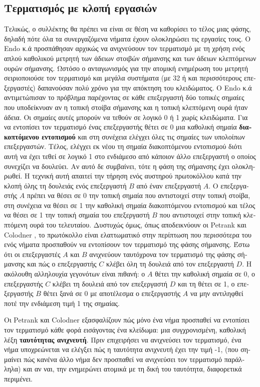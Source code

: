 \begin{greek}
\subsection{Τερματισμός με κλοπή εργασιών}
Τελικώς, ο συλλέκτης θα πρέπει να είναι σε θέση να καθορίσει
το τέλος μιας φάσης, δηλαδή πότε όλα τα συνεργαζόμενα νήματα
έχουν ολοκληρώσει τις εργασίες τους. Ο Endo κ.ά \cite{DBLP:conf/sc/EndoTY97}
προσπάθησαν αρχικώς να ανιχνεύσουν τον τερματισμό με τη χρήση
ενός απλού καθολικού μετρητή των άδειων στοιβών σήμανσης και
των άδειων κλεπτόμενων ουρών σήμανσης. Ωστόσο ο ανταγωνισμός
για την ατομική ενημέρωση του μετρητή σειριοποιούσε τον τερματισμό
και μεγάλα συστήματα (με 32 ή και περισσότερους επεξεργαστές)
δαπανούσαν πολύ χρόνο για την απόκτηση του κλειδώματος.
O Endo κ.ά αντιμετώπισαν το πρόβλημα παρέχοντας σε κάθε επεξεργαστή
δύο τοπικές σημαίες που υποδείκνυαν αν η τοπική στοίβα σήμανσης
και η τοπική κλεπτόμενη ουρά ήταν άδεια. Οι σημαίες αυτές
μπορούν να τεθούν σε λογικό 0 ή 1 χωρίς κλειδώματα. Για να
εντοπίσει τον τερματισμό ένας επεξεργαστής θέτει σε 0 μια
καθολική σημαία \textbf{διακοπτόμενου εντοπισμού} και στη
συνέχεια ελέγχει όλες τις σημαίες των υπολοίπων επεξεργαστών.
Τέλος, ελέγχει εκ νέου τη σημαία διακοπτόμενου εντοπισμού
διότι αυτή να έχει τεθεί σε λογικό 1 στο ενδιάμεσο από κάποιον
άλλο επεξεργαστή ο οποίος συνεχίζει να δουλεύει. Αν αυτό
δε συμβαίνει, τότε η φάση της σήμανσης έχει ολοκληρωθεί.
Η τεχνική αυτή απαιτεί την τήρηση ενός αυστηρού πρωτοκόλλου
κατά την κλοπή όλης τη δουλειάς ενός επεξεργαστή  $B$ από
έναν επεξεργαστή $A$. Ο επεξεργαστής $A$ πρέπει να θέσει σε
0 την τοπική σημαία που αντιστοιχεί στην τοπική στοίβα, στη
συνέχεια να θέσει σε 1 την καθολική σημαία διακοπτόμενου
εντοπισμού και τέλος να θέσει σε 1 την τοπική σημαία του
επεξεργαστή $B$ που αντιστοιχεί στην τοπική κλεπτόμενη ουρά
του τελευταίου. Δυστυχώς όμως, όπως αποδεικνύουν οι Petrank
και Colodner \cite{DBLP:journals/ppl/PetrankK04}, το πρωτόκολλο
είναι ελαττωματικό στην περίπτωση που περισσότερα του ενός
νήματα προσπαθούν να εντοπίσουν τον τερματισμό της φάσης
σήμανσης. Έστω ότι οι επεξεργαστές $A$ και $B$ ανιχνεύουν
ταυτόχρονα τον τερματισμό της φάσης σήμανσης και πώς ο επεξεργαστής
$C$ κλέβει όλη τη δουλειά από τον επεξεργαστή $D$. Η ακόλουθη
αλληλουχία γεγονότων είναι πιθανή: ο $A$ θέτει την καθολική
σημαία σε 0, ο επεξεργαστής $C$ κλέβει τη δουλειά από τον επεξεργαστή
$D$ και τη θέτει σε 1, ο επεξεργαστής $B$ θέτει ξανά σε 0
με αποτέλεσμα ο επεξεργαστής $A$ να μην αντιληφθεί ποτέ την
ενδιάμεση τιμή 1 της σημαίας.

Οι Petrank και Colodner \cite{DBLP:journals/ppl/PetrankK04}
εξασφαλίζουν πώς μόνο ένα νήμα προσπαθεί να εντοπίσει τον
τερματισμό κάθε φορά εισάγοντας ένα κλείδωμα: μια συγχρονισμένη,
καθολική λέξη \textbf{ταυτότητας ανιχνευτή}. Πριν επιχειρήσει
να ανιχνεύσει τον τερματισμό, ένα νήμα υποχρεώνεται να ελέγξει
πώς η ταυτότητα ανιχνευτή έχει την τιμή -1, (που σημαίνει πώς
κανένα άλλο νήμα δεν προσπαθεί να ανιχνεύσει τον τερματισμό
παράλληλα) και αν ναι, την ενημερώνει ατομικά με τη δική του
ταυτότητα, διαφορετικά περιμένει.


\end{greek}
